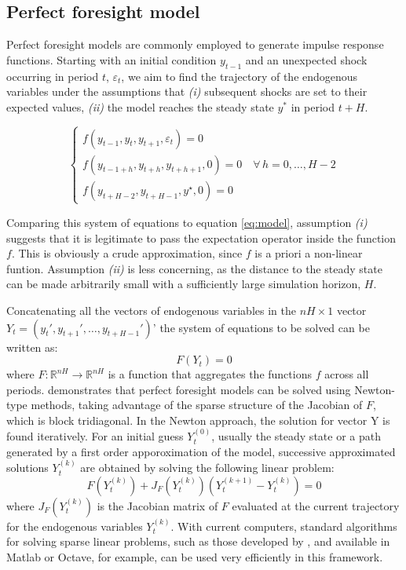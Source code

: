 \documentclass[a4paper,11pt]{amsart}
\begin{document}
\subsection{Perfect foresight model}\label{sec:pf}

Perfect foresight models are commonly employed to generate impulse
response functions. Starting with an initial condition \(y_{t-1}\) and
an unexpected shock occurring in period \(t\), \(\varepsilon_t\), we
aim to find the trajectory of the endogenous variables under the
assumptions that \emph{(i)} subsequent shocks are set to their
expected values, \emph{(ii)} the model reaches the steady
state \(y^*\) in period \(t+H\).

\begin{equation}\label{eq:pf}
   \begin{cases}
      f\left(y_{t-1},y_t,y_{t+1},\varepsilon_t\right) = 0                            \\
      f\left(y_{t-1+h}, y_{t+h}, y_{t+h+1}, 0\right) =0 \quad\forall\, h=0,\dots,H-2 \\
      f\left(y_{t+H-2}, y_{t+H-1}, y^{\star}, 0\right) =0
   \end{cases}
\end{equation}

\smallskip\smallskip

Comparing this system of equations to equation \eqref{eq:model},
assumption \emph{(i)} suggests that it is legitimate to pass the
expectation operator inside the function \(f\). This is obviously a
crude approximation, since \(f\) is a priori a non-linear
funtion. Assumption \emph{(ii)} is less concerning, as the distance to
the steady state can be made arbitrarily small with a sufficiently
large simulation horizon, $H$.\newline

Concatenating all the vectors of endogenous variables in
the \(nH\times 1\)
vector \(Y_t = \left(y_t',y_{t+1}', \ldots, y_{t+H-1}' \right)\)' the
system of equations to be solved can be written as:
\[
   F(Y_t) = 0
\]
where $F: \mathbb{R}^{nH} \rightarrow \mathbb{R}^{nH}$ is a function
that aggregates the functions $f$ across all
periods. \textcite{Laffargue1990} demonstrates that perfect foresight
models can be solved using Newton-type methods, taking advantage of
the sparse structure of the Jacobian of $F$, which is block
tridiagonal. In the Newton approach, the solution for vector Y is
found iteratively. For an initial guess $Y_t^{(0)}$, usually the
steady state or a path generated by a first order apporoximation of
the model, successive approximated solutions $Y_t^{(k)}$ are obtained
by solving the following linear problem:
\[
   F\left( Y_t^{(k)} \right) + J_F\left(Y_t^{(k)}\right) \left( Y_t^{(k+1)} - Y_t^{(k)} \right)  = 0
\]
where $J_F\left(Y_t^{(k)}\right)$ is the Jacobian matrix of $F$
evaluated at the current trajectory for the endogenous
variables $Y_t^{(k)}$. With current computers, standard algorithms for
solving sparse linear problems, such as those developed by
\textcite{Davis2006}, and available in Matlab or Octave, for example,
can be used very efficiently in this framework.\newline
\end{document}
